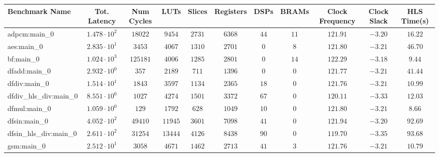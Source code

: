 \begin{tabular}{|l|c|c|c|c|c|c|c|c|c|c|}
\hline
Benchmark Name          & Tot. Latency           & Num Cycles & LUTs      & Slices    & Registers & DSPs    & BRAMs   & Clock Frequency & Clock Slack & HLS Time(s) \\
\hline
adpcm:main\_0           & $ 1.478 \cdot 10^{2} $ & $ 18022  $ & $ 9454  $ & $ 2731  $ & $ 6368  $ & $ 44  $ & $ 11  $ & $ 121.91      $ & $ -3.20   $ & $ 16.22   $ \\
aes:main\_0             & $ 2.835 \cdot 10^{1} $ & $ 3453   $ & $ 4067  $ & $ 1310  $ & $ 2701  $ & $ 0   $ & $ 8   $ & $ 121.80      $ & $ -3.21   $ & $ 46.70   $ \\
bf:main\_0              & $ 1.024 \cdot 10^{3} $ & $ 125181 $ & $ 4006  $ & $ 1285  $ & $ 2801  $ & $ 0   $ & $ 14  $ & $ 122.29      $ & $ -3.18   $ & $ 9.44    $ \\
dfadd:main\_0           & $ 2.932 \cdot 10^{0} $ & $ 357    $ & $ 2189  $ & $ 711   $ & $ 1396  $ & $ 0   $ & $ 0   $ & $ 121.77      $ & $ -3.21   $ & $ 41.44   $ \\
dfdiv:main\_0           & $ 1.514 \cdot 10^{1} $ & $ 1843   $ & $ 3597  $ & $ 1134  $ & $ 2365  $ & $ 18  $ & $ 0   $ & $ 121.76      $ & $ -3.21   $ & $ 10.99   $ \\
dfdiv\_hls\_div:main\_0 & $ 8.551 \cdot 10^{0} $ & $ 1027   $ & $ 4274  $ & $ 1501  $ & $ 3372  $ & $ 67  $ & $ 0   $ & $ 120.11      $ & $ -3.33   $ & $ 12.03   $ \\
dfmul:main\_0           & $ 1.059 \cdot 10^{0} $ & $ 129    $ & $ 1792  $ & $ 628   $ & $ 1049  $ & $ 10  $ & $ 0   $ & $ 121.80      $ & $ -3.21   $ & $ 8.66    $ \\
dfsin:main\_0           & $ 4.052 \cdot 10^{2} $ & $ 49410  $ & $ 11945 $ & $ 3601  $ & $ 7098  $ & $ 41  $ & $ 0   $ & $ 121.94      $ & $ -3.20   $ & $ 92.69   $ \\
dfsin\_hls\_div:main\_0 & $ 2.611 \cdot 10^{2} $ & $ 31254  $ & $ 13444 $ & $ 4126  $ & $ 8438  $ & $ 90  $ & $ 0   $ & $ 119.70      $ & $ -3.35   $ & $ 93.68   $ \\
gsm:main\_0             & $ 2.512 \cdot 10^{1} $ & $ 3058   $ & $ 4671  $ & $ 1462  $ & $ 2713  $ & $ 41  $ & $ 3   $ & $ 121.76      $ & $ -3.21   $ & $ 10.79   $ \\

\end{tabular}
